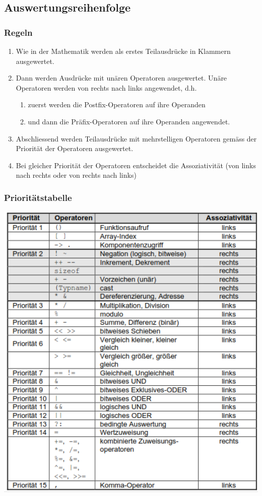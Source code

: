 		\subsection{Auswertungsreihenfolge }
			\subsubsection{Regeln}
				\begin{enumerate}
					\item Wie in der Mathematik werden als erstes Teilausdrücke in Klammern ausgewertet.
					\item Dann werden Ausdrücke mit unären Operatoren ausgewertet. Unäre Operatoren werden von rechts nach links angewendet, d.h.
					\begin{enumerate}
						\item zuerst werden die Postfix-Operatoren auf ihre Operanden
						\item und dann die Präfix-Operatoren auf ihre Operanden angewendet.
					\end{enumerate}
					\item Abschliessend werden Teilausdrücke mit mehrstelligen Operatoren gemäss der Priorität der Operatoren ausgewertet.
					\item Bei gleicher Priorität der Operatoren entscheidet die Assoziativität (von links
					nach rechts oder von rechts nach links)
				\end{enumerate}
			\begin{minipage}[t]{9 cm}
				\subsubsection{Prioritätstabelle}
					\includegraphics[width=1\textwidth]{pics/priotabelle.png}
			\end{minipage}
